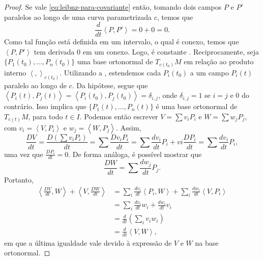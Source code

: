 \begin{proposition}
\begin{proof}
		Se vale \eqref{eq:leibnz-para-covariante} então, tomando dois campos $P$ e $P'$ paralelos ao longo de uma curva parametrizada $c$, temos que
		\begin{equation*}
			\frac{d}{dt}\left<P,P'\right>=0+0 = 0.
		\end{equation*}
		Como tal função está definida em um intervalo, o qual é conexo, temos que $\left<P,P'\right>$ tem derivada $0$ em um conexo. Logo, é constante \cite{munkres2000topology}.
		Reciprocamente, seja $\{ P_{1}(t_{0}), \dots, P_{n}(t_{0}) \}$ uma base ortonormal de $T_{c(t_{0})}M$ em relação ao produto interno $\left<,\right>_{c(t_{0})}$.
		Utilizando a , estendemos cada $P_{i}(t_{0})$ a um campo $P_{i}(t)$ paralelo ao longo de $c$.
		Da hipótese, segue que $\left<P_{i}(t),P_{j}(t)\right>=\left<P_{i}(t_{0}),P_{j}(t_{0})\right>=\delta_{i,j}$, onde $\delta_{i,j}=1$ se $i=j$ e $0$ do contrário. Isso implica que $\{ P_{1}(t), \dots, P_{n}(t) \}$ é uma base ortonormal de $T_{c(t)}M$, para todo $t \in I$.
		Podemos então escrever $V=\sum v_{i}P_{i}$ e $W=\sum w_{j}P_{j}$, com $v_{i}=\left<V,P_{i}\right>$ e $w_{j}=\left<W,P_{j}\right>$.
		Assim,
		\begin{equation*}
			\frac{DV}{dt}=\frac{D\left( \sum v_{i}P_{i} \right)}{dt}=\sum\frac{Dv_{i}P_{i}}{dt}=\sum \frac{dv_{i}}{dt}P_{i}+vi\frac{DP_{i}}{dt} = \sum\frac{dv_{i}}{dt}P_{i},
		\end{equation*}
		uma vez que $\frac{DP_{i}}{dt}=0$.
		De forma análoga, é possível mostrar que
		\begin{equation*}
			\frac{DW}{dt}=\sum\frac{dw_{j}}{dt}P_{j}.
		\end{equation*}
		Portanto,
		\begin{align*}
			\left<\frac{DV}{dt},W\right> + \left<V,\frac{DW}{dt}\right> & = \sum_{i}\frac{dv_{i}}{dt}\left<P_{i},W\right> + \sum_{i}\frac{dw_{i}}{dt}\left<V,P_{i}\right> \\
			                                                            & = \sum_{i} \frac{dv_{i}}{dt}w_{i} + \frac{dw_{i}}{dt}v_{i}                                      \\
			                                                            & = \frac{d}{dt}\left( \sum_{i}v_{i}w_{i} \right)                                                 \\
			                                                            & = \frac{d}{dt}\left<V,W\right>  ,
		\end{align*}
		em que a última igualdade vale devido à expressão de $V$ e $W$ na base ortonormal.
	\end{proof}
\end{proposition}
